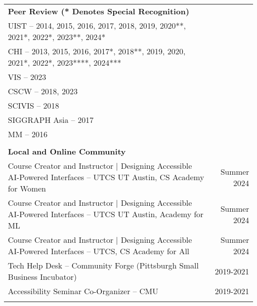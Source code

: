 \begin{longtable}{Xr}
	\textbf{Peer Review (* Denotes Special Recognition)} &  \\
	UIST -- 2014, 2015, 2016, 2017, 2018, 2019, 2020**, 2021*, 2022*, 2023**, 2024* &  \\
	CHI -- 2013, 2015, 2016, 2017*, 2018**, 2019, 2020, 2021*, 2022*, 2023****, 2024*** &  \\
	VIS -- 2023 &  \\
	CSCW -- 2018, 2023 &  \\
	SCIVIS -- 2018 &  \\
	SIGGRAPH Asia -- 2017 &  \\
	MM -- 2016 &  \\
	\\

	\textbf{Local and Online Community} &  \\
	Course Creator and Instructor | Designing Accessible AI-Powered Interfaces -- UTCS UT Austin, CS Academy for Women & Summer 2024 \\
	Course Creator and Instructor | Designing Accessible AI-Powered Interfaces -- UTCS UT Austin, Academy for ML & Summer 2024 \\
	Course Creator and Instructor | Designing Accessible AI-Powered Interfaces -- UTCS, CS Academy for All & Summer 2024 \\
	Tech Help Desk -- Community Forge (Pittsburgh Small Business Incubator) & 2019-2021 \\
	Accessibility Seminar Co-Organizer -- CMU & 2019-2021 \\
	\\

\end{longtable}